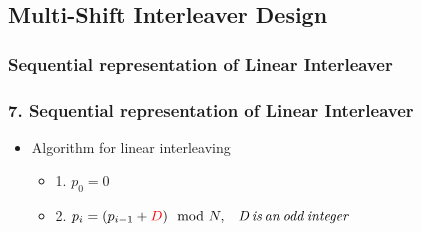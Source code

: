 \documentclass{beamer}  %
\begin{document}

\subsection{Multi-Shift Interleaver Design}
\subsubsection{Sequential representation of Linear Interleaver }
\begin{frame}
\frametitle{7. Sequential representation of Linear Interleaver}

\begin{itemize}
\setlength\itemsep{2em}



 \item Algorithm for linear interleaving



\begin{itemize}
\setlength\itemsep{1.5em}
\item 1. $p_0=0$
 
\item 2. $p_i=(p_{i-1}+\textcolor{red}{D}) \mod N,\,\,\,\,\,  \mathit{D \,is \,an \,odd \,integer}$ 

\end{itemize}




\end{itemize}


\end{frame}
\end{document}
